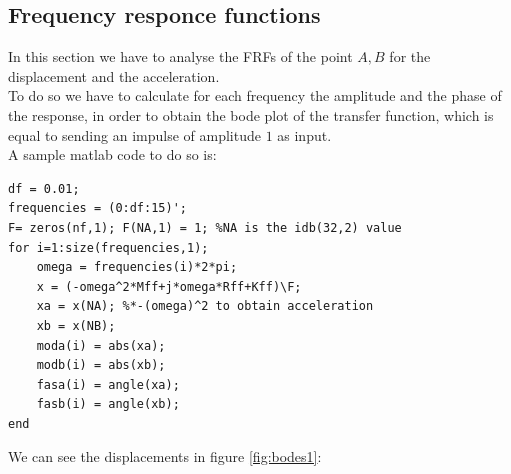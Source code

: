 \documentclass[10pt,a4paper,final]{report}
\begin{document}
\subsection{Frequency responce functions}
In this section we have to analyse the FRFs of the point $A,B$ for the displacement and the acceleration. \\ To do so we have to calculate for each frequency the amplitude and the phase of the response, in order to obtain the bode plot of the transfer function, which is equal to sending an impulse of amplitude $1$ as input. \\
A sample matlab code to do so is:
\begin{lstlisting}
df = 0.01;
frequencies = (0:df:15)';
F= zeros(nf,1); F(NA,1) = 1; %NA is the idb(32,2) value
for i=1:size(frequencies,1);
	omega = frequencies(i)*2*pi;
	x = (-omega^2*Mff+j*omega*Rff+Kff)\F;
	xa = x(NA); %*-(omega)^2 to obtain acceleration
	xb = x(NB);
	moda(i) = abs(xa); 
	modb(i) = abs(xb);
	fasa(i) = angle(xa);
	fasb(i) = angle(xb);
end
\end{lstlisting}
We can see the displacements in figure \ref{fig:bodes1}:\\
\end{document}
